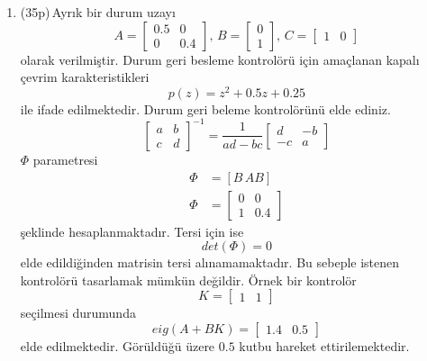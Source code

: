 \begin{enumerate}[\bfseries S1.]
    \item (35p)\,Ayrık bir durum uzayı
    \begin{equation}
        A=\begin{bmatrix}0.5& 0\\0&0.4\end{bmatrix},\,B=\begin{bmatrix}0\\1\end{bmatrix},\,C=\begin{bmatrix}1&0\end{bmatrix}
    \end{equation}
    olarak verilmiştir. Durum geri besleme kontrolörü için amaçlanan kapalı çevrim karakteristikleri
    \begin{equation}
        p(z)=z^2+0.5z+0.25
    \end{equation}
    ile ifade edilmektedir. Durum geri beleme kontrolörünü elde ediniz.
    \begin{equation*}
        \begin{bmatrix}a& b\\c&d\end{bmatrix}^{-1}=\frac{1}{ad-bc}\begin{bmatrix}d& -b\\-c&a\end{bmatrix}
    \end{equation*}
    $\Phi$ parametresi 
    \begin{equation}
        \begin{split}
            \Phi&=[B\, AB]\\
            \Phi&=\begin{bmatrix}
            0& 0\\
            1& 0.4
            \end{bmatrix}
        \end{split}
    \end{equation}
    şeklinde hesaplanmaktadır. Tersi için ise
    \begin{equation}
            det(\Phi)=0
    \end{equation}
    elde edildiğinden matrisin tersi alınamamaktadır. Bu sebeple istenen kontrolörü tasarlamak mümkün değildir. Örnek bir kontrolör 
    \begin{equation}
        K=\begin{bmatrix}1& 1\end{bmatrix}
    \end{equation}
    seçilmesi durumunda
    \begin{equation}
        eig(A+BK)=\begin{bmatrix}1.4&0.5\end{bmatrix}
    \end{equation}
    elde edilmektedir. Görüldüğü üzere $0.5$ kutbu hareket ettirilemektedir.


\end{enumerate}
